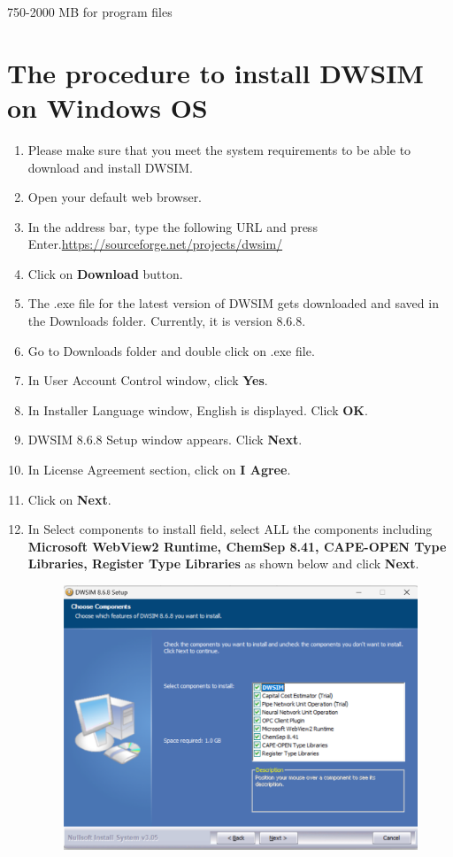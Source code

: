 \documentclass[a4paper,12pt]{article}
\begin{document}
750-2000 MB for program files

\section{The procedure to install DWSIM on Windows OS}

\begin{enumerate}
\item Please make sure that you meet the system requirements to be able to download and install DWSIM.
\item Open your default web browser.
\item In the address bar, type the following URL and press Enter.\newline \url{https://sourceforge.net/projects/dwsim/}
\item Click on \textbf{Download} button.
\item The .exe file for the latest version of DWSIM gets downloaded and saved in the Downloads folder. Currently, it is version 8.6.8.
\item Go to Downloads folder and double click on .exe file.
\item In User Account Control window, click \textbf{Yes}.
\item In Installer Language window, English is displayed. Click \textbf{OK}.
\item DWSIM 8.6.8 Setup window appears. Click \textbf{Next}.
\item In License Agreement section, click on \textbf{I Agree}.
\item Click on \textbf{Next}.
\item In Select components to install field, select ALL the components including \textbf{Microsoft WebView2 Runtime, ChemSep 8.41, CAPE-OPEN Type Libraries, Register Type Libraries} as shown below and click \textbf{Next}.

\begin{figure}[H]
	\centering
	\includegraphics[width=0.75\linewidth]{DWSIM-Components.png}
\end{figure}


\end{enumerate}
\end{document}

